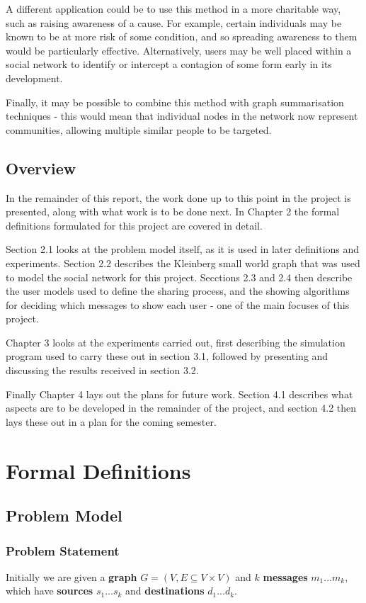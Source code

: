 \documentclass[bsc,frontabs,twoside,singlespacing,parskip,deptreport]{infthesis}     %
\begin{document}
A different application could be to use this method in a more charitable way, such as raising awareness of a cause. For example, certain individuals may be known to be at more risk of some condition, and so spreading awareness to them would be particularly effective. Alternatively, users may be well placed within a social network to identify or intercept a contagion of some form early in its development.

Finally, it may be possible to combine this method with graph summarisation techniques\cite{GraphSummary} - this would mean that individual nodes in the network now represent communities, allowing multiple similar people to be targeted.

\section{Overview}
In the remainder of this report, the work done up to this point in the project is presented, along with what work is to be done next. In Chapter 2 the formal definitions formulated for this project are covered in detail. 

Section 2.1 looks at the problem model itself, as it is used in later definitions and experiments. Section 2.2 describes the Kleinberg small world graph that was used to model the social network for this project. Secctions 2.3 and 2.4 then describe the user models used to define the sharing process, and the showing algorithms for deciding which messages to show each user - one of the main focuses of this project.

Chapter 3 looks at the experiments carried out, first describing the simulation program used to carry these out in section 3.1, followed by presenting and discussing the results received in section 3.2.

Finally Chapter 4 lays out the plans for future work. Section 4.1 describes what aspects are to be developed in the remainder of the project, and section 4.2 then lays these out in a plan for the coming semester.

\chapter{Formal Definitions}
\section{Problem Model}

\subsection{Problem Statement}
Initially we are given a \textbf{graph} $G = (V, E \subseteq V \times V)$ and $k$ \textbf{messages} $ m_{1} ... m_{k}$, which have \textbf{sources} $s_{1} ... s_{k}$ and \textbf{destinations} $d_{1} ... d_{k}$. 
\end{document}
